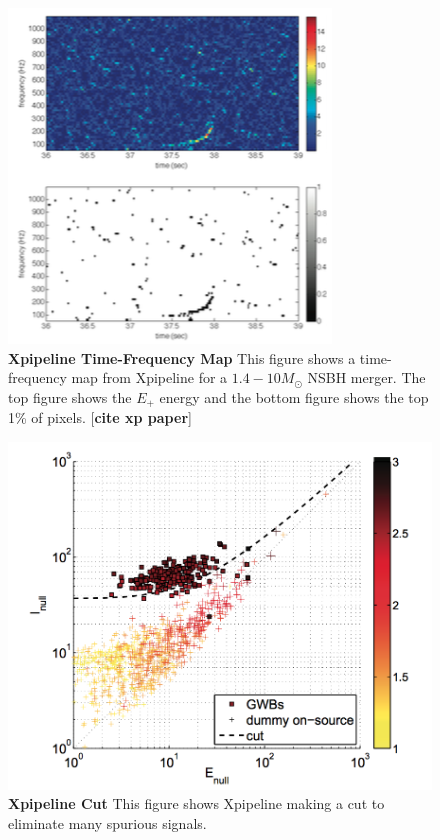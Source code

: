 \documentclass[11pt]{cuthesis}
\begin{document}
\begin{figure} %
\begin{center}
\includegraphics[width=0.8\linewidth]{xpipelineTFmap.png}
\end{center}
\caption{\textbf{Xpipeline Time-Frequency Map} This figure shows a time-frequency map from Xpipeline for a $1.4-10 M_\odot$ NSBH merger. The top figure shows the $E_+$ energy and the bottom figure shows the top 1\% of pixels. [\textbf{cite xp paper}] } 
\label{fig:tfmap}
\end{figure}

\begin{figure} %
\begin{center}
\includegraphics[width=0.8\linewidth]{xpipeline_cut.png}
\end{center}
\caption{\textbf{Xpipeline Cut} This figure shows Xpipeline making a cut to eliminate many spurious signals. } %
\label{fig:xcuts}
\end{figure}
\end{document}
